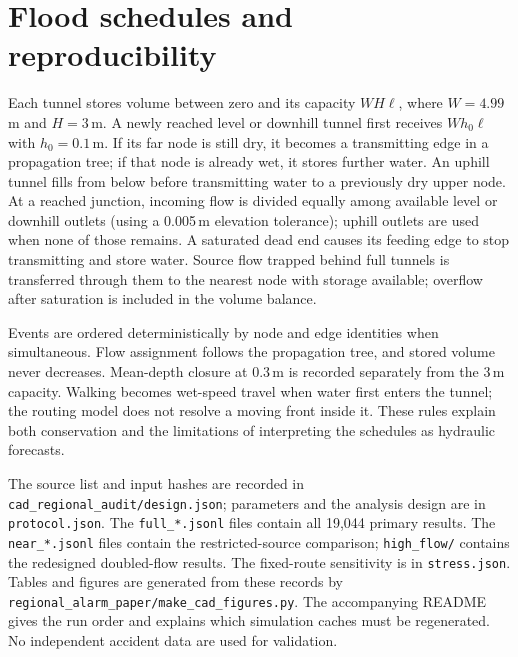 \documentclass[11pt,a4paper]{article}
\begin{document}
\section{Flood schedules and reproducibility}\label{app:flood}
Each tunnel stores volume between zero and its capacity $WH\ell$, where $W=4.99$\,m and $H=3$\,m. A newly reached level or downhill tunnel first receives $Wh_0\ell$ with $h_0=0.1$\,m. If its far node is still dry, it becomes a transmitting edge in a propagation tree; if that node is already wet, it stores further water. An uphill tunnel fills from below before transmitting water to a previously dry upper node. At a reached junction, incoming flow is divided equally among available level or downhill outlets (using a 0.005\,m elevation tolerance); uphill outlets are used when none of those remains. A saturated dead end causes its feeding edge to stop transmitting and store water. Source flow trapped behind full tunnels is transferred through them to the nearest node with storage available; overflow after saturation is included in the volume balance.

Events are ordered deterministically by node and edge identities when simultaneous. Flow assignment follows the propagation tree, and stored volume never decreases. Mean-depth closure at 0.3\,m is recorded separately from the 3\,m capacity. Walking becomes wet-speed travel when water first enters the tunnel; the routing model does not resolve a moving front inside it. These rules explain both conservation and the limitations of interpreting the schedules as hydraulic forecasts.

The source list and input hashes are recorded in \texttt{cad\_regional\_audit/design.json}; parameters and the analysis design are in \texttt{protocol.json}. The \texttt{full\_*.jsonl} files contain all 19,044 primary results. The \texttt{near\_*.jsonl} files contain the restricted-source comparison; \texttt{high\_flow/} contains the redesigned doubled-flow results. The fixed-route sensitivity is in \texttt{stress.json}. Tables and figures are generated from these records by \texttt{regional\_alarm\_paper/make\_cad\_figures.py}. The accompanying README gives the run order and explains which simulation caches must be regenerated. No independent accident data are used for validation.

\clearpage
\end{document}
